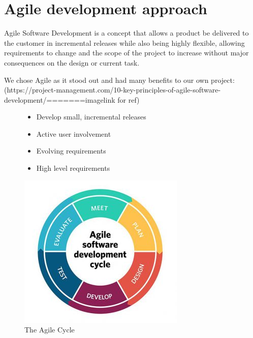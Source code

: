 \section{Agile development approach}
Agile Software Development is a concept that allows a product be delivered to the customer in incremental releases while also being highly flexible, allowing requirements to change and the scope of the project to increase without major consequences on the design or current task\cite{agile}.

We chose Agile as it stood out and had many benefits to our own project:
(https://project-management.com/10-key-principles-of-agile-software-development/=======imagelink for ref)

\begin{figure}[H]
\begin{minipage}{.5\textwidth}  %
\lstset{linewidth = 4cm, breaklines=true} %
\begin{itemize}
\item Develop small, incremental releases
\item Active user involvement
\item Evolving requirements
\item High level requirements
\end{itemize}

\end{minipage}
\qquad %
\begin{minipage}{0.4\textwidth} %
\includegraphics[scale=.4]{img/agile.jpg} %
\caption{The Agile Cycle}
\end{minipage}
\end{figure}

